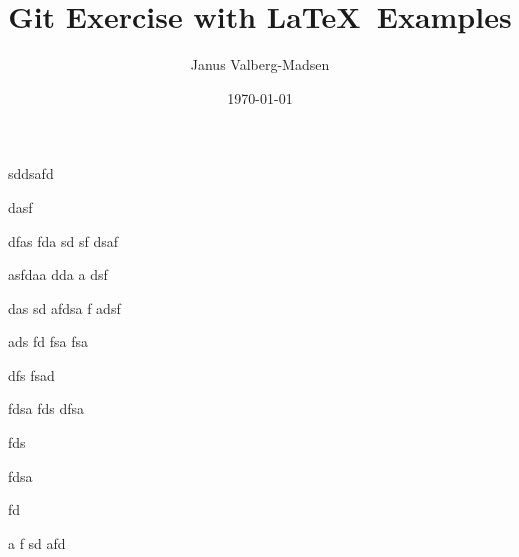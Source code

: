 \documentclass[10pt,a4paper]{article}
\title{Git Exercise with \LaTeX\ Examples}
\author{Janus Valberg-Madsen}
\date{\today}
\begin{document}
\maketitle

\begin{abstract}
  
\end{abstract}

\tableofcontents


sddsafd

dasf

dfas
fda
sd
sf
dsaf


asfdaa
dda
a
dsf

das
sd
afdsa
f
adsf

ads
fd
fsa
fsa

dfs
fsad

fdsa
fds
dfsa

fds

fdsa

fd

a
f
sd
afd


\end{document}
